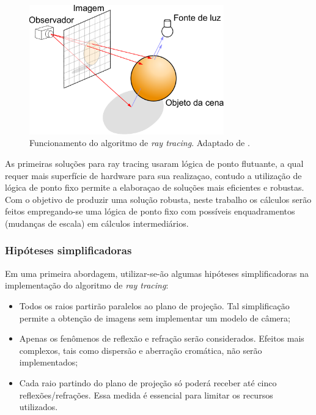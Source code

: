\documentclass[a4paper,12pt]{article}
\newcommand\raytracing{\emph{ray tracing}}
\begin{document}
\begin{figure}[htb]
  \centering
  \includegraphics[width=0.75\textwidth]{figures/Ray_trace_diagram}
  \caption{Funcionamento do algoritmo de \raytracing. Adaptado de
    \cite{wiki:ray_tracing}.}
  \label{fig:Ray_trace_diagram}
\end{figure}

As primeiras soluções para ray tracing usaram lógica de ponto flutuante, a qual
requer mais superfície de hardware para sua realizaçao, contudo a utilização de
lógica de ponto fixo permite a elaboraçao de soluções mais eficientes e
robustas. \cite{hanika} Com o objetivo de produzir uma solução robusta, neste
trabalho os cálculos serão feitos empregando-se uma lógica
de ponto fixo com possíveis enquadramentos (mudanças de escala) em cálculos
intermediários.

\subsubsection{Hipóteses simplificadoras}
Em uma primeira abordagem, utilizar-se-ão algumas hipóteses simplificadoras na
implementação do algoritmo de \raytracing:

\begin{itemize}
\item Todos os raios partirão paralelos ao plano de projeção. Tal simplificação
  permite a obtenção de imagens sem implementar um modelo de câmera;
\item Apenas os fenômenos de reflexão e refração serão considerados. Efeitos
  mais complexos, tais como dispersão e aberração cromática, não serão
  implementados;
\item Cada raio partindo do plano de projeção só poderá receber até cinco
  reflexões/refrações. Essa medida é essencial para limitar os
  recursos utilizados.
\end{itemize}
\end{document}
